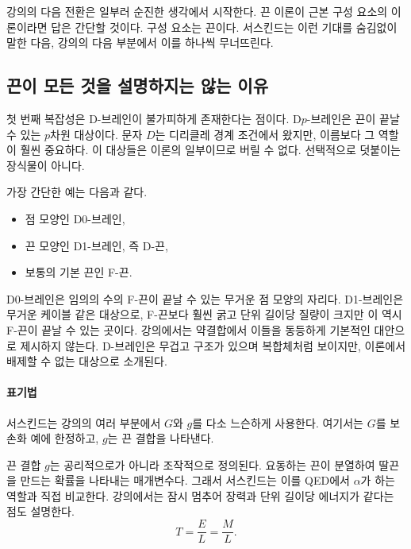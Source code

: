 강의의 다음 전환은 일부러 순진한 생각에서 시작한다. 끈 이론이 근본 구성 요소의 이론이라면 답은 간단할 것이다. 구성 요소는 끈이다. 서스킨드는 이런 기대를 숨김없이 말한 다음, 강의의 다음 부분에서 이를 하나씩 무너뜨린다.

\subsection{끈이 모든 것을 설명하지는 않는 이유}

첫 번째 복잡성은 D-브레인이 불가피하게 존재한다는 점이다. D\(p\)-브레인은 끈이 끝날 수 있는 \(p\)차원 대상이다. 문자 \(D\)는 디리클레 경계 조건에서 왔지만, 이름보다 그 역할이 훨씬 중요하다. 이 대상들은 이론의 일부이므로 버릴 수 없다. 선택적으로 덧붙이는 장식물이 아니다.

가장 간단한 예는 다음과 같다.
\begin{itemize}
\item 점 모양인 D0-브레인,
\item 끈 모양인 D1-브레인, 즉 D-끈,
\item 보통의 기본 끈인 F-끈.
\end{itemize}
D0-브레인은 임의의 수의 F-끈이 끝날 수 있는 무거운 점 모양의 자리다. D1-브레인은 무거운 케이블 같은 대상으로, F-끈보다 훨씬 굵고 단위 길이당 질량이 크지만 이 역시 F-끈이 끝날 수 있는 곳이다. 강의에서는 약결합에서 이들을 동등하게 기본적인 대안으로 제시하지 않는다. D-브레인은 무겁고 구조가 있으며 복합체처럼 보이지만, 이론에서 배제할 수 없는 대상으로 소개된다.


\paragraph{표기법}
서스킨드는 강의의 여러 부분에서 \(G\)와 \(g\)를 다소 느슨하게 사용한다. 여기서는 \(G\)를 보손화 예에 한정하고, \(g\)는 끈 결합을 나타낸다.

끈 결합 \(g\)는 공리적으로가 아니라 조작적으로 정의된다. 요동하는 끈이 분열하여 딸끈을 만드는 확률을 나타내는 매개변수다. 그래서 서스킨드는 이를 QED에서 \(\alpha\)가 하는 역할과 직접 비교한다. 강의에서는 잠시 멈추어 장력과 단위 길이당 에너지가 같다는 점도 설명한다.
\begin{equation}
T=\frac{E}{L}=\frac{M}{L}.
\end{equation}

